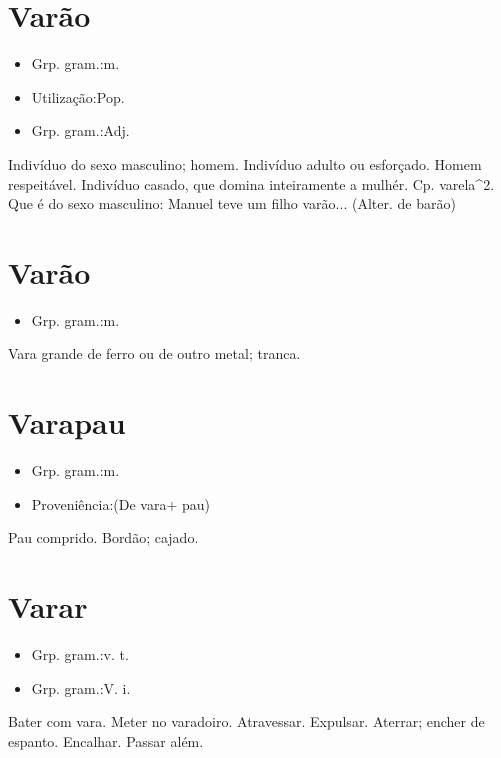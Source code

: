 \documentclass{article}
\begin{document}
\section{Varão}
\begin{itemize}
\item {Grp. gram.:m.}
\end{itemize}
\begin{itemize}
\item {Utilização:Pop.}
\end{itemize}
\begin{itemize}
\item {Grp. gram.:Adj.}
\end{itemize}
Indivíduo do sexo masculino; homem.
Indivíduo adulto ou esforçado.
Homem respeitável.
Indivíduo casado, que domina inteiramente a mulhér. Cp. \textunderscore varela\textunderscore ^2.
Que é do sexo masculino: \textunderscore Manuel teve um filho varão...\textunderscore 
(Alter. de \textunderscore barão\textunderscore )
\section{Varão}
\begin{itemize}
\item {Grp. gram.:m.}
\end{itemize}
Vara grande de ferro ou de outro metal; tranca.
\section{Varapau}
\begin{itemize}
\item {Grp. gram.:m.}
\end{itemize}
\begin{itemize}
\item {Proveniência:(De \textunderscore vara\textunderscore  + \textunderscore pau\textunderscore )}
\end{itemize}
Pau comprido.
Bordão; cajado.
\section{Varar}
\begin{itemize}
\item {Grp. gram.:v. t.}
\end{itemize}
\begin{itemize}
\item {Grp. gram.:V. i.}
\end{itemize}
Bater com vara.
Meter no varadoiro.
Atravessar.
Expulsar.
Aterrar; encher de espanto.
Encalhar.
Passar além.
\end{document}
